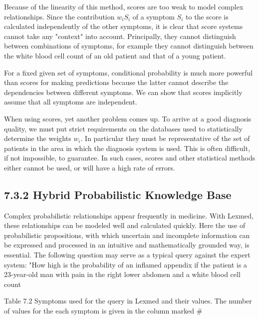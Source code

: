 \documentclass[10pt]{article}
\begin{document}
Because of the linearity of this method, scores are too weak to model complex relationships. Since the contribution $w_{i} S_{i}$ of a symptom $S_{i}$ to the score is calculated independently of the other symptoms, it is clear that score systems cannot take any "context" into account. Principally, they cannot distinguish between combinations of symptoms, for example they cannot distinguish between the white blood cell count of an old patient and that of a young patient.

For a fixed given set of symptoms, conditional probability is much more powerful than scores for making predictions because the latter cannot describe the dependencies between different symptoms. We can show that scores implicitly assume that all symptoms are independent.

When using scores, yet another problem comes up. To arrive at a good diagnosis quality, we must put strict requirements on the databases used to statistically determine the weights $w_{i}$. In particular they must be representative of the set of patients in the area in which the diagnosis system is used. This is often difficult, if not impossible, to guarantee. In such cases, scores and other statistical methods either cannot be used, or will have a high rate of errors.

\subsection*{7.3.2 Hybrid Probabilistic Knowledge Base}
Complex probabilistic relationships appear frequently in medicine. With Lexmed, these relationships can be modeled well and calculated quickly. Here the use of probabilistic propositions, with which uncertain and incomplete information can be expressed and processed in an intuitive and mathematically grounded way, is essential. The following question may serve as a typical query against the expert system: "How high is the probability of an inflamed appendix if the patient is a 23-year-old man with pain in the right lower abdomen and a white blood cell count

Table 7.2 Symptoms used for the query in Lexmed and their values. The number of values for the each symptom is given in the column marked \#
\end{document}
